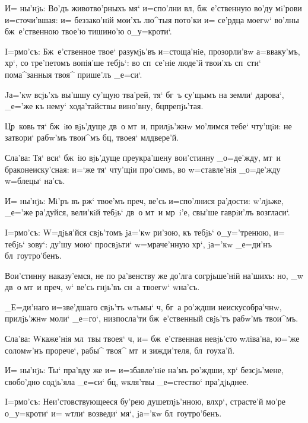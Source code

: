 И= ны'нjь: Во'дъ животво'рныхъ мя` и=спо'лни вл, 
бж~е'ственную во'ду мi'рови и=сточи'вшая: и= беззако'нiй 
мои'хъ лю^тыя пото'ки и= се'рдца моегw` во'лны 
бж~е'ственною твое'ю тишино'ю о_у=кроти`.


I=рмо'съ: Бж~е'ственное твое` разумjь'въ и=стоща'нiе, 
прозорли'вw а=вваку'мъ, хр`, со тре'петомъ вопiя'ше 
тебjь`: во сп~се'нiе люде'й твои'хъ сп~сти` пома^занныя 
твоя^ прише'лъ _е=си`.

Jа='кw всjь'хъ вы'шшу су'щую тва'рей, тя` бг~ъ су'щымъ 
на земли` дарова`, _е='же къ нему` хода'тайствы вино'вну, 
бц препjь'тая.

Цр~ковь тя` бж~iю вjь'дуще дв~о мт~и, прилjь'жнw 
мо'лимся тебе` чту'щiи: не затвори` рабw'мъ твои^мъ 
бц, твоея` мл двере'й.

Сла'ва: Тя` вси` бж~iю вjь'дуще преукра'шену 
вои'стинну _о=де'жду, мт~и браконеиску'сная: и=`же тя` 
чту'щiи про'симъ, во w=ставле'нiя _о=де'жду w=блецы` 
на'съ. 

И= ны'нjь: Мi'ръ въ рж` твое'мъ преч, ве'сь 
и=спо'лнися ра'дости: w'лjьже, _е='же ра'дуйся, 
вели'кiй тебjь` дв~о мт~и мр~i'е, свы'ше гаврiи'лъ 
возгласи`.


I=рмо'съ: W=дjья'йся свjь'томъ jа='кw ри'зою, къ 
тебjь` о_у='тренюю, и= тебjь` зову`: ду'шу мою` 
просвjьти` w=мраче'нную хр`, jа='кw _е=ди'нъ 
бл~гоутро'бенъ.

Вои'стинну наказу'емся, не по ра'венству же до'лга 
согрjьше'нiй на'шихъ: но, _w дв~о мт~и преч, 
w` ве'сь гнjь'въ сн~а твоегw` w\т на'съ.

_Е=ди'наго и=зве'дшаго свjь'тъ w\т тьмы` ч, бг~а 
ро'ждши неискусобра'чнw, прилjь'жнw моли` _е=го`, 
низпосла'ти бж~е'ственный свjь'тъ рабw'мъ твои^мъ.

Сла'ва: W\т каже'нiя мл~твы твоея` ч, и= 
бж~е'ственная невjь'сто w\т лiва'на, ю='же соломw'нъ 
прорече`, рабы^ твоя^ мт~и зижди'теля, бл~гоуха'й.

И= ны'нjь: Ты` пра'вду же и= и=збавле'нiе на'мъ 
ро'ждши, хр` без\ъ сjь'мене, свобо'дно содjь'яла 
_е=си` бц, w\т кля'твы _е=стество` пра'дjьднее.


I=рмо'съ: Неи'стовствующееся бу'рею душетлjь'нною, 
вл хр`, страсте'й мо'ре о_у=кроти` и= w\т тли` 
возведи` мя`, jа='кw бл~гоутро'бенъ.

